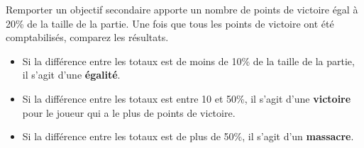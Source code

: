 Remporter un objectif secondaire apporte un nombre de points de victoire égal à 20\% de la taille de la partie. Une fois que tous les points de victoire ont été comptabilisés, comparez les résultats.
\begin{itemize}
\item Si la différence entre les totaux est de moins de 10\% de la taille de la partie, il s'agit d'une \textbf{égalité}.
\item Si la différence entre les totaux est entre 10 et 50\%, il s'agit d'une \textbf{victoire} pour le joueur qui a le plus de points de victoire.
\item Si la différence entre les totaux est de plus de 50\%, il s'agit d'un \textbf{massacre}.
\end{itemize}
